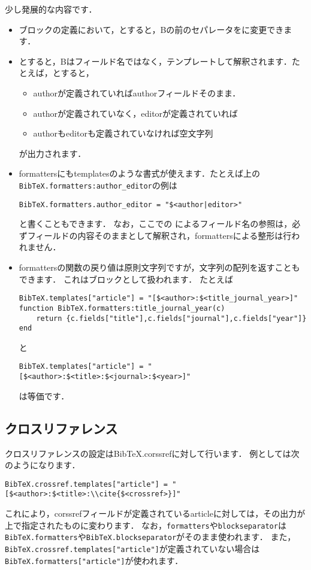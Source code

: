 \documentclass[a4paper]{ltjsarticle}
\newcommand{\luafunc}[1]{\texttt{#1}}
\newcommand*{\luavar}[1]{\texttt{#1}}
\begin{document}
少し発展的な内容です．
\begin{itemize}
\item ブロックの定義において，\luastring{[A:@S<sep>B:C]}とすると，Bの前のセパレータをに変更できます．
\item {}とすると，Bはフィールド名ではなく，テンプレートして解釈されます．たとえば，とすると，
\begin{itemize}
\item authorが定義されていればauthorフィールドそのまま．
\item authorが定義されていなく，editorが定義されていれば
\item authorもeditorも定義されていなければ空文字列
\end{itemize}
が出力されます．
\item formattersにもtemplatesのような書式が使えます．たとえば上の\luafunc{BibTeX.formatters:author\_editor}の例は
\begin{lstlisting}
BibTeX.formatters.author_editor = "$<author|editor>"
\end{lstlisting}
と書くこともできます．
なお，ここでの%
によるフィールド名の参照は，必ずフィールドの内容そのままとして解釈され，formattersによる整形は行われません．
\item formattersの関数の戻り値は原則文字列ですが，文字列の配列を返すこともできます．
これはブロックとして扱われます．
たとえば
\begin{lstlisting}
BibTeX.templates["article"] = "[$<author>:$<title_journal_year>]"
function BibTeX.formatters:title_journal_year(c)
    return {c.fields["title"],c.fields["journal"],c.fields["year"]}
end
\end{lstlisting}
と
\begin{lstlisting}
BibTeX.templates["article"] = "[$<author>:$<title>:$<journal>:$<year>]"
\end{lstlisting}
は等価です．
\end{itemize}

\subsection{クロスリファレンス}
クロスリファレンスの設定はBibTeX.corssrefに対して行います．
例としては次のようになります．
\begin{lstlisting}
BibTeX.crossref.templates["article"] = "[$<author>:$<title>:\\cite{$<crossref>}]"
\end{lstlisting}
これにより，corssrefフィールドが定義されているarticleに対しては，その出力が上で指定されたものに変わります．
なお，\luavar{formatters}や\luavar{blockseparator}は\luavar{BibTeX.formatters}や\luavar{BibTeX.blockseparator}がそのまま使われます．
また，\luavar{BibTeX.crossref.templates["article"]}が定義されていない場合は\luavar{BibTeX.formatters["article"]}が使われます．
\end{document}
